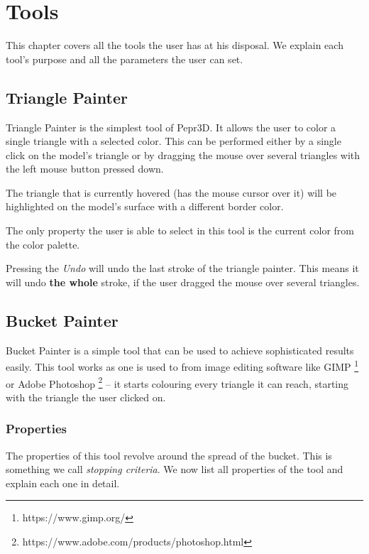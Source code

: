 \chapter{Tools}

This chapter covers all the tools the user has at his disposal. We explain each tool's purpose and all the parameters the user can set.

\section{Triangle Painter}

Triangle Painter is the simplest tool of Pepr3D. It allows the user to color a single triangle with a selected color. This can be performed either by a single click on the model's triangle or by dragging the mouse over several triangles with the left mouse button pressed down.

The triangle that is currently hovered (has the mouse cursor over it) will be highlighted on the model's surface with a different border color.

The only property the user is able to select in this tool is the current color from the color palette.

Pressing the \textit{Undo} will undo the last stroke of the triangle painter. This means it will undo \textbf{the whole} stroke, if the user dragged the mouse over several triangles.

\section{Bucket Painter}

Bucket Painter is a simple tool that can be used to achieve sophisticated results easily. This tool works as one is used to from image editing software like GIMP \footnote{https://www.gimp.org/} or Adobe Photoshop \footnote{https://www.adobe.com/products/photoshop.html} -- it starts colouring every triangle it can reach, starting with the triangle the user clicked on.

\subsection{Properties}

The properties of this tool revolve around the spread of the bucket. This is something we call \textit{stopping criteria}. We now list all properties of the tool and explain each one in detail.


